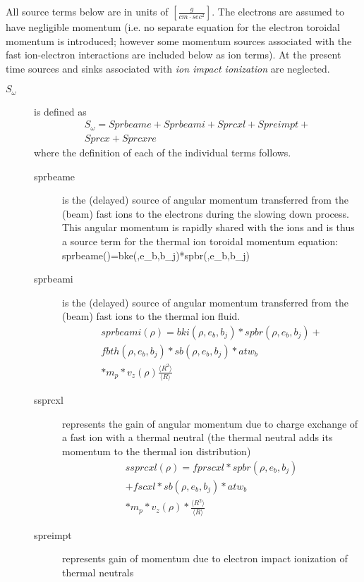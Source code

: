 All source terms below are in units of  $[\frac{g}{cm \cdot sec^2}]$. The
electrons are assumed to have negligible momentum (i.e. no separate equation for
the electron toroidal momentum is introduced; however some momentum sources
associated with the fast ion-electron interactions are included below as ion
terms). At the present time sources and sinks associated with \emph{ion impact
ionization} are neglected.
\begin{description}
 \item[ $S_\omega $] is defined as
 \begin{multline}
  S_\omega=Sprbeame+Sprbeami+Sprcxl+Spreimpt+\\
  Sprcx+Sprcxre 
 \end{multline}
 where the definition of each of the individual terms follows.
 \begin{description}  %
  \item[sprbeame] is the (delayed) source of angular momentum  transferred from
  the (beam) fast ions  to the electrons during the slowing down process. This
  angular momentum is rapidly shared with the ions and is thus a source term for
  the thermal ion toroidal momentum equation:
  \beq
   sprbeame(\rho)=bke(\rho,e_b,b_j)*spbr(\rho,e_b,b_j)
  \eeq
  \item[sprbeami] is the (delayed) source of angular momentum transferred from
  the (beam) fast ions to the thermal ion fluid.
  \begin{multline}
   sprbeami(\rho)=bki(\rho,e_b,b_j)*spbr(\rho,e_b,b_j)+ \\
   fbth(\rho,e_b,b_j)*sb(\rho,e_b,b_j)*atw_b \\
   *m_p*v_z(\rho)\frac{\langle R^2\rangle}{\langle R\rangle}
  \end{multline}
  \item[ssprcxl] represents the gain of  angular momentum due to charge exchange
  of a fast ion with a thermal neutral (the thermal neutral adds its momentum to
  the thermal ion distribution)
  \begin{multline}
   ssprcxl(\rho)=fprscxl*spbr(\rho,e_b,b_j) \\
   +fscxl*sb(\rho,e_b,b_j)*atw_b \\
   *m_p*v_z(\rho)*\frac{\langle R^2\rangle}{\langle R\rangle}
  \end{multline}
  \item[spreimpt] represents gain of momentum due to electron impact ionization
  of thermal neutrals
  \begin{multline}

\end{multline}
\end{description}
\end{description}
